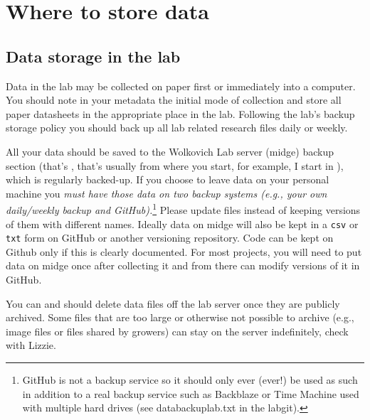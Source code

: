 \documentclass[11pt,a4paper,oneside]{article}
\begin{document}
\section{Where to store data}
\subsection{Data storage in the lab}
\label{labstorage}
Data in the lab may be collected on paper first or immediately into a computer. You should note in your metadata the initial mode of collection and store all paper datasheets in the appropriate place in the lab. Following the lab's backup storage policy you should back up all lab related research files daily or weekly. 

All your data should be saved to the Wolkovich Lab server (midge) backup section (that's , that's usually  from where you start, for example, I start in ), which is regularly backed-up. If you choose to leave data on your personal machine you \emph{must have those data on two backup systems (e.g., your own daily/weekly backup and GitHub).}\footnote{GitHub is not a backup service so it should only ever (ever!) be used as such in addition to a real backup service such as Backblaze or Time Machine used with multiple hard drives (see databackuplab.txt in the labgit).} Please update files instead of keeping versions of them with different names. Ideally data on midge will also be kept in a \verb|csv| or \verb|txt| form on GitHub or another versioning repository. Code can be kept on Github only if this is clearly documented. For most projects, you will need to put data on midge once after collecting it and from there can modify versions of it in GitHub. 

You can and should delete data files off the lab server once they are publicly archived. Some files that are too large or otherwise not possible to archive (e.g., image files or files shared by growers) can stay on the server indefinitely, check with Lizzie. 

\end{document}
